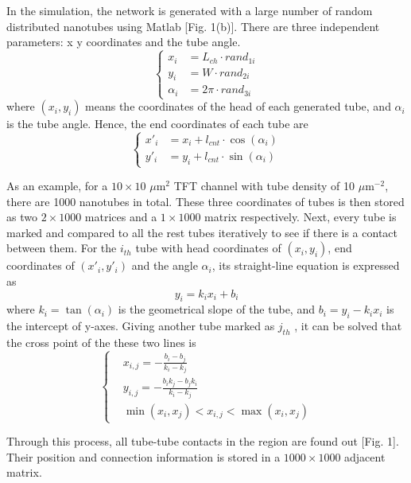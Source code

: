 \documentclass[letterpaper, 10 pt, conference]{ieeeconf}
\begin{document}
In the simulation, the network is generated with a large number of random distributed nanotubes using Matlab [Fig. 1(b)]. There are three independent parameters: x y coordinates and the tube angle.
\begin{equation}
  \left\{
  \begin{aligned}
    x_{i}&=L_{ch}\cdot rand_{1i} \\
    y_{i}&=W\cdot rand_{2i} \\
    \alpha_{i}&=2\pi\cdot rand_{3i}
  \end{aligned}
  \right.
\end{equation}
where $(x_i,y_i)$ means the coordinates of the head of each generated tube, and $\alpha_i$ is the tube angle. Hence, the end coordinates of each tube are
\begin{equation}
  \left\{
  \begin{aligned}
    x'_{i}&=x_{i}+l_{cnt}\cdot\cos(\alpha_{i}) \\
    y'_{i}&=y_{i}+l_{cnt}\cdot\sin(\alpha_{i})
  \end{aligned}
  \right.
\end{equation}

As an example, for a $10\times 10$ $\mu$m$^2$ TFT channel with tube density of 10 $\mu$m$^{-2}$, there are 1000 nanotubes in total. These three coordinates of tubes is then stored as two $2\times1000$ matrices and a $1\times1000$ matrix respectively. Next, every tube is marked and compared to all the rest tubes iteratively to see if there is a contact between them. For the $i_{th}$  tube with head coordinates of $(x_i,y_i)$, end coordinates of $(x'_i,y'_i)$ and the angle $\alpha_{i}$, its straight-line equation is expressed as
$$y_i=k_ix_i+b_i$$
where $k_i=\tan(\alpha_{i})$ is the geometrical slope of the tube, and $b_i=y_i-k_ix_i$ is the intercept of y-axes. Giving another tube marked as $j_{th}$ , it can be solved that the cross point of the these two lines is
\begin{equation}
  \left\{
  \begin{aligned}
    &x_{i,j}=-\frac{b_i-b_j}{k_i-k_j} \\
    &y_{i,j}=-\frac{b_ik_j-b_jk_i}{k_i-k_j} \\
    &\min(x_i,x_j)<x_{i,j}<\max(x_i,x_j)
  \end{aligned}
  \right.
\end{equation}

Through this process, all tube-tube contacts in the region are found out [Fig. 1]. Their position and connection information is stored in a $1000\times1000$ adjacent matrix.
\end{document}
